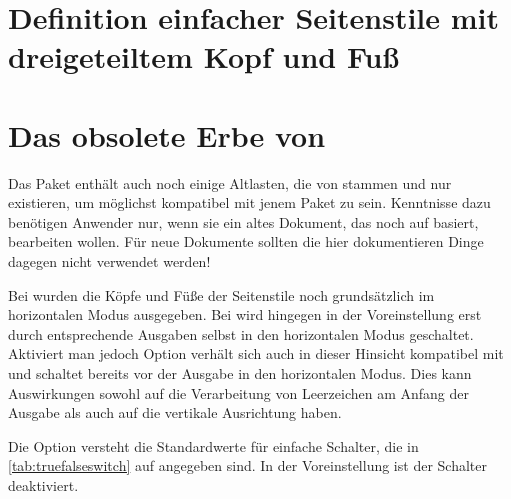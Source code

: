 \section{Definition einfacher Seitenstile mit dreigeteiltem Kopf und Fuß}


\section{Das obsolete Erbe von }

\begin{Explain}
  Das Paket  enthält auch noch einige Altlasten, die
  von  stammen und nur existieren, um möglichst kompatibel
  mit jenem Paket zu sein. Kenntnisse dazu benötigen Anwender nur, wenn sie
  ein altes Dokument, das noch auf  basiert, bearbeiten
  wollen. Für neue Dokumente sollten die hier dokumentieren
  Dinge dagegen nicht verwendet werden!
\end{Explain}

\begin{Declaration}
\end{Declaration}
Bei  wurden die Köpfe und Füße der Seitenstile noch
grundsätzlich im horizontalen Modus ausgegeben. Bei 
wird hingegen in der Voreinstellung erst durch entsprechende Ausgaben selbst
in den horizontalen Modus geschaltet. Aktiviert man jedoch Option
 verhält sich  auch in dieser Hinsicht
kompatibel mit  und schaltet bereits vor der Ausgabe in den
horizontalen Modus. Dies kann Auswirkungen sowohl auf die Verarbeitung von
Leerzeichen am Anfang der Ausgabe als auch auf die vertikale Ausrichtung
haben.

Die Option versteht die Standardwerte für einfache Schalter, die in
\autoref{tab:truefalseswitch} auf  angegeben
sind. In der Voreinstellung ist der Schalter deaktiviert.%
\EndIndexGroup

%
\EndIndexGroup



